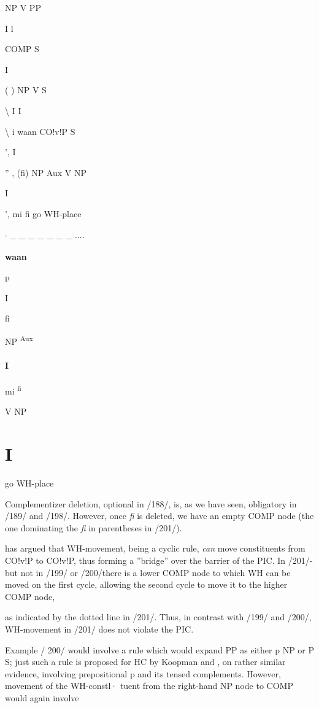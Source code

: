 NP V PP

I l

COMP S

I

( ) NP V S

{\textbackslash} I I

{\textbackslash} i waan CO!v!P S

', I

'' , (fi) NP Aux V NP 

I

', mi fi go WH-place

\textsubscript{' }\_ \_ \_ \_ \_ \_ \_ ....

\bfseries
waan

p

I

fi

NP \textsuperscript{Aux} 

\paragraph{I}

mi \textsuperscript{fi}

V NP

\section{I }

go WH-place

Complementizer deletion, optional in /188/, is, as we have seen, obliga\-tory in /189/ and /198/. However, once \textit{fi} is deleted, we have an empty COMP node (the one dominating the \textit{fi} in parentheses in /201/).

\citet{Chomsky1977} has argued that WH-movement, being a cyclic rule, \textit{can} move constituents from CO!v!P to CO!v!P, thus forming a ''bridge'' over the barrier of the PIC. In /201/-but not in /199/ or /200/\-there is a lower COMP node to which WH can be moved on the first cycle, allowing the second cycle to move it to the higher COMP node,

as indicated by the dotted line in /201/. Thus, in contrast with /199/ and /200/, WH-movement in /201/ does not violate the PIC.

Example / 200/ would involve a rule which would expand PP as either p NP or P S; just such a rule is proposed for HC by Koopman and \citet{Lefebvre1981}, on rather similar evidence, involving prepositional p and its tensed complements. However, movement of the WH-constl· tuent from the right-hand NP node to COMP would again involve

